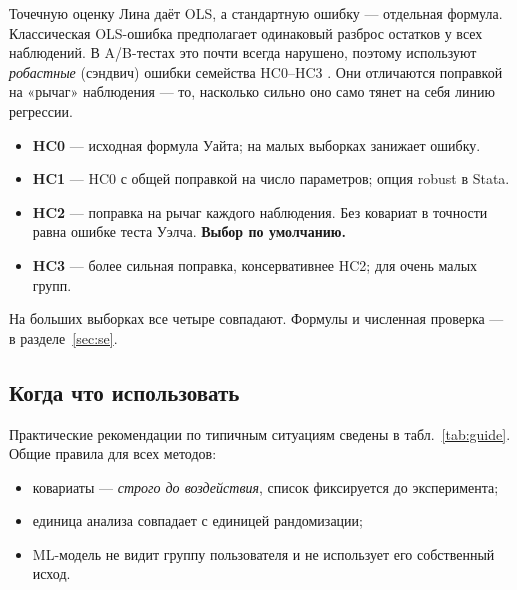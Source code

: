 \documentclass[10pt,a4paper]{article}
\newcommand{\codeus}{\textunderscore\allowbreak}
\newcommand{\code}[1]{{\small\ttfamily\let\_\codeus #1}}
\begin{document}
Точечную оценку Лина даёт OLS, а стандартную ошибку --- отдельная формула. Классическая
OLS-ошибка предполагает одинаковый разброс остатков у всех наблюдений. В A/B-тестах это почти
всегда нарушено, поэтому используют \emph{робастные} (сэндвич) ошибки семейства HC0--HC3
\citep{whitehc, mackinnonwhite1985}. Они отличаются поправкой на «рычаг» наблюдения --- то, насколько
сильно оно само тянет на себя линию регрессии.
\begin{itemize}
  \item \textbf{HC0} --- исходная формула Уайта; на малых выборках занижает ошибку.
  \item \textbf{HC1} --- HC0 с общей поправкой на число параметров; опция \code{robust} в Stata.
  \item \textbf{HC2} --- поправка на рычаг каждого наблюдения. Без ковариат в точности равна ошибке
        теста Уэлча. \textbf{Выбор по умолчанию.}
  \item \textbf{HC3} --- более сильная поправка, консервативнее HC2; для очень малых групп.
\end{itemize}
На больших выборках все четыре совпадают. Формулы и численная проверка --- в разделе~\ref{sec:se}.

\subsection{Когда что использовать}

Практические рекомендации по типичным ситуациям сведены в табл.~\ref{tab:guide}. Общие правила для всех методов:
\begin{itemize}
  \item ковариаты --- \emph{строго до воздействия}, список фиксируется до эксперимента;
  \item единица анализа совпадает с единицей рандомизации;
  \item ML-модель не видит группу пользователя и не использует его собственный исход.
\end{itemize}
\end{document}
